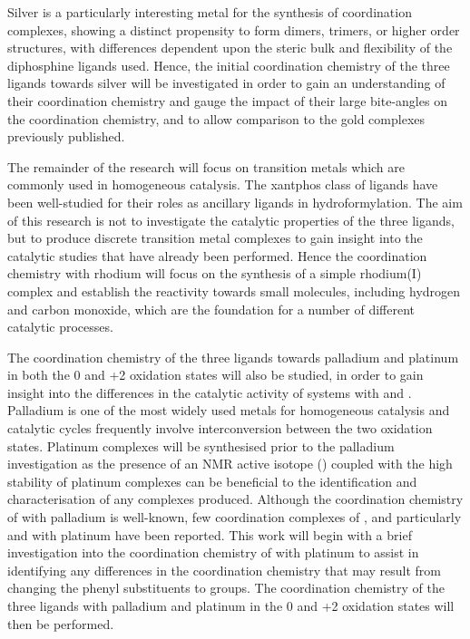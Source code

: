 Silver is a particularly interesting metal for the synthesis of coordination complexes, showing a distinct propensity to form dimers, trimers, or higher order structures, with differences dependent upon the steric bulk and flexibility of the diphosphine ligands used.\cite{Meijboom2009}  Hence, the initial coordination chemistry of the three \tBuxantphos{} ligands towards silver will be investigated in order to gain an understanding of their coordination chemistry and gauge the impact of their large bite-angles on the coordination chemistry, and to allow comparison to the gold \tBuxantphos{} complexes previously published.

The remainder of the research will focus on transition metals which are commonly used in homogeneous catalysis.  The xantphos class of ligands have been well-studied for their roles as ancillary ligands in hydroformylation.\cite{Veen1998, Veen1999b, Veen2002, Zuidema2008, Petocz2004, Bronger2003, Kranenburg1995}  The aim of this research is not to investigate the catalytic properties of the three \tBuxantphos{} ligands, but to produce discrete transition metal complexes to gain insight into the catalytic studies that have already been performed.  Hence the coordination chemistry with rhodium will focus on the synthesis of a simple rhodium(I) complex and establish the reactivity towards small molecules, including hydrogen and carbon monoxide, which are the foundation for a number of different catalytic processes.  

The coordination chemistry of the three \tBuxantphos{} ligands towards palladium and platinum in both the 0 and +2 oxidation states will also be studied, in order to gain insight into the differences in the catalytic activity of systems with \tBuxantphos{} and \Phxantphos{}.  Palladium is one of the most widely used metals for homogeneous catalysis and catalytic cycles frequently involve interconversion between the two oxidation states.\cite{Tsuji1995}  Platinum complexes will be synthesised prior to the palladium investigation as the presence of an NMR active isotope (\Pt) coupled with the high stability of platinum complexes can be beneficial to the identification and characterisation of any complexes produced.  Although the coordination chemistry of \Phxantphos{} with palladium is well-known, few coordination complexes of \Phxantphos{}, and particularly \Phthixantphos{} and \Phsixantphos{} with platinum have been reported.  This work will begin with a brief investigation into the coordination chemistry of \Phthixantphos{} with platinum to assist in identifying any differences in the coordination chemistry that may result from changing the phenyl substituents to \tBu{} groups.  The coordination chemistry of the three \tBuxantphos{} ligands with palladium and platinum in the 0 and +2 oxidation states will then be performed.

